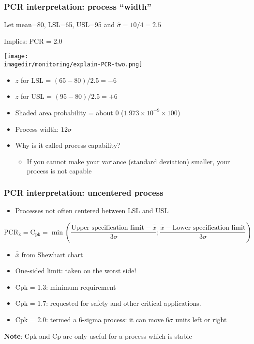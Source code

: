 \begin{frame}\frametitle{PCR interpretation: process ``width''}

	Let mean=80, LSL=65, USL=95 and $\hat{\sigma} = 10/4 = 2.5$

	Implies: PCR = 2.0
	\begin{center}
		\texttt{[image: \\imagedir/monitoring/explain-PCR-two.png]}
	\end{center}
	\begin{itemize}
		\item	$z$ for LSL = $(65 - 80)/2.5 = -6$
		\item	$z$ for USL = $(95 - 80)/2.5 = +6$
		\item	Shaded area probability = about 0 ($1.973\times 10^{-9} \times 100$)
		\item	Process width: $12 \sigma$
		\item	Why is it called process capability?
		\begin{itemize}
			\item	If you cannot make your variance (standard deviation) smaller, your process is not capable
		\end{itemize}
	\end{itemize}
\end{frame}

\begin{frame}\frametitle{PCR interpretation: uncentered process}
	\begin{itemize}
		\item	Processes not often centered between LSL and USL
	\end{itemize}

	$ \text{PCR}_\text{k} = \text{C}_\text{pk} = \min \left( \dfrac{\text{Upper specification limit} - \bar{\bar{x}}}{3\sigma}; \dfrac{\bar{\bar{x}} - \text{Lower specification limit}}{3\sigma} \right) $
	\begin{itemize}
		\item	$\bar{\bar{x}}$ from Shewhart chart
		\item	One-sided limit: taken on the worst side!
		\item	Cpk = 1.3: minimum requirement
		\item	Cpk = 1.7: requested for safety and other critical applications.
		\item	Cpk = 2.0: termed a 6-sigma process: it can move $6\sigma$ units left or right
	\end{itemize}

	\textbf{Note}: Cpk and Cp are only useful for a process which is stable
\end{frame}

